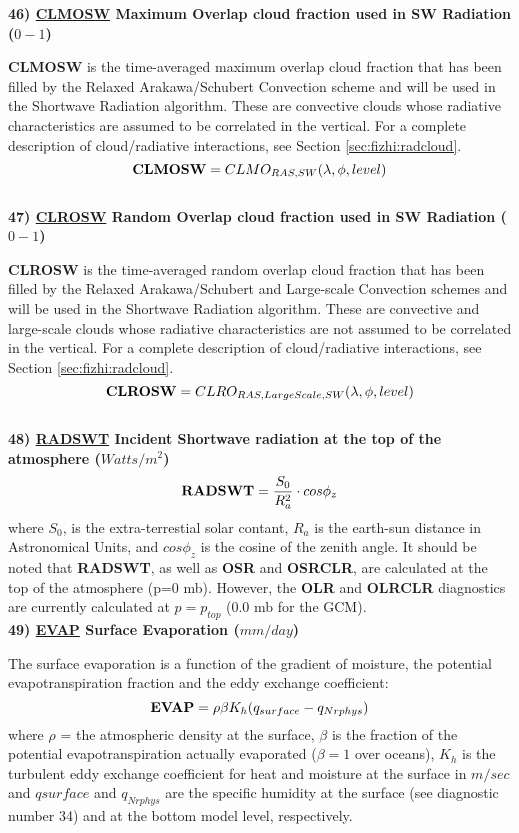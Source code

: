 \noindent
{\bf 46) \underline {CLMOSW} Maximum Overlap cloud fraction used in SW Radiation ($0-1$) }

\noindent
{\bf CLMOSW} is the time-averaged maximum overlap cloud fraction that has been filled by the Relaxed
Arakawa/Schubert Convection scheme and will be used in the Shortwave Radiation algorithm.  These are
convective clouds whose radiative characteristics are assumed to be correlated in the vertical.
For a complete description of cloud/radiative interactions, see Section \ref{sec:fizhi:radcloud}.
\[
{\bf CLMOSW} = CLMO_{RAS,SW}(\lambda, \phi,  level )
\]
\\

\noindent
{\bf 47) \underline {CLROSW} Random Overlap cloud fraction used in SW Radiation ($0-1$) }

\noindent
{\bf CLROSW} is the time-averaged random overlap cloud fraction that has been filled by the Relaxed
Arakawa/Schubert and Large-scale Convection schemes and will be used in the Shortwave 
Radiation algorithm.  These are
convective and large-scale clouds whose radiative characteristics are not 
assumed to be correlated in the vertical.
For a complete description of cloud/radiative interactions, see Section \ref{sec:fizhi:radcloud}.
\[
{\bf CLROSW} = CLRO_{RAS,Large Scale,SW}(\lambda, \phi,  level )
\]
\\

\noindent
{\bf 48)  \underline {RADSWT} Incident Shortwave radiation at the top of the atmosphere ($Watts/m^2$) }
\[
{\bf RADSWT} = {\frac{S_0}{R_a^2}} \cdot cos \phi_z
\]
\noindent
where $S_0$, is the extra-terrestial solar contant,
$R_a$ is the earth-sun distance in Astronomical Units,
and $cos \phi_z$ is the cosine of the zenith angle.
It should be noted that {\bf RADSWT}, as well as
{\bf OSR} and {\bf OSRCLR}, 
are calculated at the top of the atmosphere (p=0 mb).  However, the
{\bf OLR} and {\bf OLRCLR} diagnostics are currently
calculated at $p= p_{top}$ (0.0 mb for the GCM).
\\
   
\noindent
{\bf 49)  \underline {EVAP}  Surface Evaporation ($mm/day$) }

\noindent
The surface evaporation is a function of the gradient of moisture, the potential 
evapotranspiration fraction and the eddy exchange coefficient:
\[
{\bf EVAP} =  \rho \beta K_{h} (q_{surface} - q_{Nrphys})
\]
where $\rho$ = the atmospheric density at the surface, $\beta$ is the fraction of
the potential evapotranspiration actually evaporated ($\beta=1$ over oceans), $K_{h}$ is the 
turbulent eddy exchange coefficient for heat and moisture at the surface in $m/sec$ and 
$q{surface}$ and $q_{Nrphys}$ are the specific humidity at the surface (see diagnostic
number 34) and at the bottom model level, respectively.
\\

